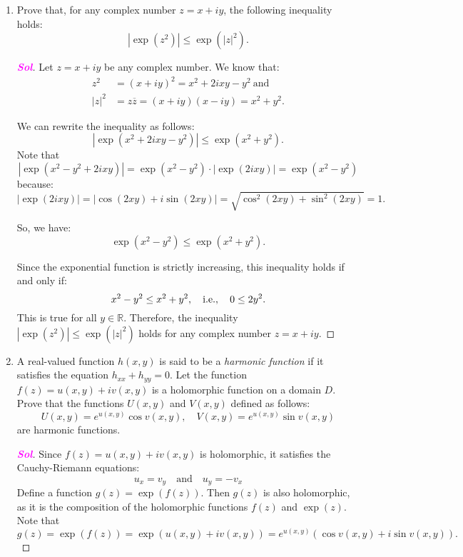 \documentclass{article}
\newcommand{\ie}{\textnormal{i.e.}}
\theoremstyle{definition}
\newcommand{\R}{\mathbb{R}}
\newcommand{\of}[1]{\left( #1 \right)}
\newcommand{\abs}[1]{\left\lvert #1 \right\rvert}
\newcommand{\sol}{\textcolor{magenta}{\bf Sol}}
\newcommand{\conjugate}[1]{\overline{#1}}
\begin{document}
\begin{enumerate}
\begin{proof}[\sol]
\begin{center}
		\end{center}
	\end{proof}

	\item Prove that, for any complex number $z = x + iy$, the following inequality holds: \[
	\abs{\exp\of{z^2}}\leq\exp\of{\abs{z}^2}.
	\]
	\begin{proof}[\sol]
		Let $z = x + iy$ be any complex number. We know that: \begin{align*}
			z^2 &= (x + iy)^2 = x^2 + 2ixy - y^2\ \text{and}\\
			|z|^2 &= z\conjugate{z} = (x + iy)(x - iy) = x^2 + y^2.
		\end{align*}

		We can rewrite the inequality as follows:
		\[
		\abs{\exp(x^2 + 2ixy - y^2)} \leq \exp(x^2 + y^2).
		\]
		Note that
		\[
		\abs{\exp(x^2 - y^2 + 2ixy)} = \exp(x^2 - y^2) \cdot \abs{\exp(2ixy)}=\exp\of{x^2-y^2}
		\] because:
		\[
		\abs{\exp(2ixy)} = \abs{\cos(2xy) + i\sin(2xy)} = \sqrt{\cos^2(2xy) + \sin^2(2xy)} = 1.
		\]
		
		So, we have:
		\[
		\exp(x^2 - y^2) \leq \exp(x^2 + y^2).
		\]
		
		Since the exponential function is strictly increasing, this inequality holds if and only if:
		\[
		x^2 - y^2 \leq x^2 + y^2,\quad\ie,\quad 0\leq 2y^2.
		\] This is true for all $y\in\R$. Therefore, the inequality $\abs{\exp(z^2)} \leq \exp(\abs{z}^2)$ holds for any complex number $z = x + iy$.
	\end{proof}
	
	\item A real-valued function $h(x, y)$ is said to be a \textit{harmonic function} if it satisfies the equation $h_{xx}+h_{yy}=0$. Let the function $f(z) = u(x, y) + i v(x, y)$ is a holomorphic function on a domain $D$. Prove that the functions $U(x, y)$ and $V(x, y)$ defined as follows: \[
	U(x,y)=e^{u(x,y)}\cos v\of{x,y},\quad V(x,y)=e^{u(x,y)}\sin v\of{x,y}
	\] are harmonic functions.
	\begin{proof}[\sol]
		Since $f(z)=u(x,y)+iv(x,y)$ is holomorphic, it satisfies the Cauchy-Riemann equations: \[
		u_x=v_y\quad\text{and}\quad u_y=-v_x
		\]
		Define a function $g(z) = \exp(f(z))$. Then $g(z)$ is also holomorphic, as it is the composition of the holomorphic functions $f(z)$ and $\exp(z)$. Note that
		\[
		g(z) = \exp\of{f\of{z}}=\exp(u(x, y) + iv(x, y)) = e^{u(x, y)}(\cos v(x, y) + i\sin v(x, y)).
		\]
		

\end{proof}
\end{enumerate}
\end{document}
